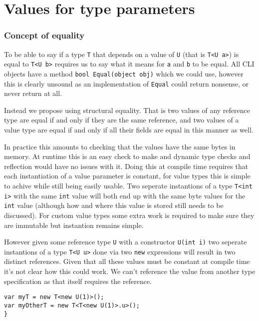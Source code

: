 \chapter{Values for type parameters}

\subsection{Concept of equality}

To be able to say if a type \texttt{T} that depends on a value of
\texttt{U} (that is \texttt{T<U a>}) is equal to \texttt{T<U b>} requires
us to say what it means for \texttt{a} and \texttt{b} to be equal.
All CLI objects have a method \texttt{bool Equal(object obj)} which
we could use, however this is clearly unsound as an implementation
of \texttt{Equal} could return nonsense, or never return at all.

Instead we propose using structural equality. That is
two values of any reference type are equal if and only if they are
the same reference, and two values of a value type are equal if and
only if all their fields are equal in this manner as well. 

In practice this amounts to checking that the values have the same bytes in memory.
At runtime this is an easy check to make and dynamic type checks and reflection would have
no issues with it. Doing this at compile time requires that each instantiation of a value 
parameter is constant, for value types this is simple to achive while still being easily usable.
Two seperate instantions of a type \texttt{T<int i>} with the same \texttt{int} value will both end 
up with the same byte values for the \texttt{int} value (although how and where this value is stored 
still needs to be discussed). For custom value types some extra work is required to make sure they are
immutable but instantion remains simple. 

However given some reference type \texttt{U} with a constructor \texttt{U(int i)} two seperate instantions of 
a type \texttt{T<U u>} done via two \texttt{new} expressions will result in two distinct references. 
Given that all these values must be constant at compile time it's not clear how this could work. We can't 
reference the value from another type specification as that itself requires the reference.

\begin{lstlisting}[caption={An issue with refernce values},keywordstyle={\color{blue}},language=sharpc]
var myT = new T<new U(1)>();
var myOtherT = new T<T<new U(1)>.u>();
}
\end{lstlisting}

